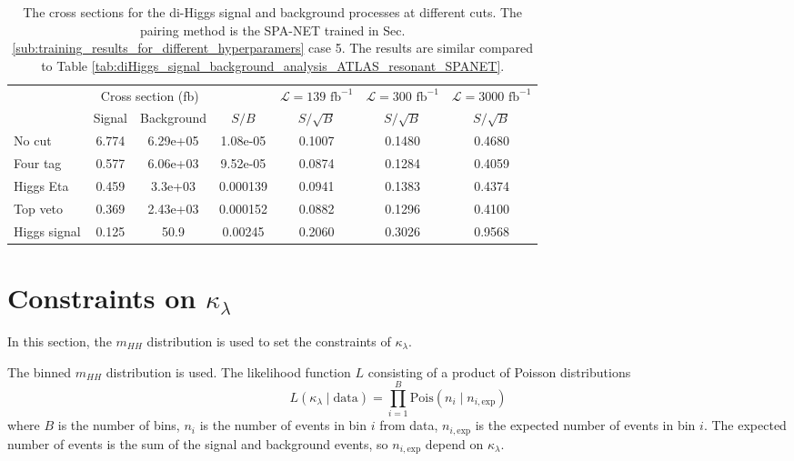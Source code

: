\documentclass[12pt]{article}
\begin{document}
		\begin{table}[htpb]
			\centering
			\caption{The cross sections for the di-Higgs signal and background processes at different cuts. The pairing method is the SPA-NET trained in Sec.\ref{sub:training_results_for_different_hyperparamers} case 5. The results are similar compared to Table \ref{tab:diHiggs_signal_background_analysis_ATLAS_resonant_SPANET}.}
			\label{tab:diHiggs_signal_background_analysis_ATLAS_best_hp_SPANET_5}
			\begin{tabular}{l|cc|c|c|c|c}
							 & \multicolumn{2}{c|}{Cross section (fb)} &          & $\mathcal{L} = 139 \text{ fb}^{-1}$ & $\mathcal{L} = 300 \text{ fb}^{-1}$ & $\mathcal{L} = 3000 \text{ fb}^{-1}$ \\
							 & Signal           & Background           & $S / B$  & $S/\sqrt{B}$                        & $S/\sqrt{B}$                        & $S/\sqrt{B}$                         \\ \hline
				No cut       & 6.774 & 6.29e+05 & 1.08e-05 & 0.1007 & 0.1480 & 0.4680 \\
				Four tag     & 0.577 & 6.06e+03 & 9.52e-05 & 0.0874 & 0.1284 & 0.4059 \\
				Higgs Eta    & 0.459 & 3.3e+03  & 0.000139 & 0.0941 & 0.1383 & 0.4374 \\
				Top veto     & 0.369 & 2.43e+03 & 0.000152 & 0.0882 & 0.1296 & 0.4100 \\
				Higgs signal & 0.125 & 50.9     & 0.00245  & 0.2060 & 0.3026 & 0.9568
			\end{tabular}
		\end{table}
\section{Constraints on \texorpdfstring{$\kappa_\lambda$}{kappa}}%
\label{sec:constraints_on_kappa}
	In this section, the $m_{HH}$ distribution is used to set the constraints of $\kappa_\lambda$.

	The binned $m_{HH}$ distribution is used. The likelihood function $L$ consisting of a product of Poisson distributions 
	\begin{equation}
		L(\kappa_\lambda \mid \text{data}) = \prod_{i=1}^{B} \text{Pois}(n_i\mid n_{i,\text{exp}})
	\end{equation}
	where $B$ is the number of bins, $n_i$ is the number of events in bin $i$ from data, $n_{i,\text{exp}}$ is the expected number of events in bin $i$. The expected number of events is the sum of the signal and background events, so $n_{i,\text{exp}}$ depend on $\kappa_\lambda$.
\end{document}
